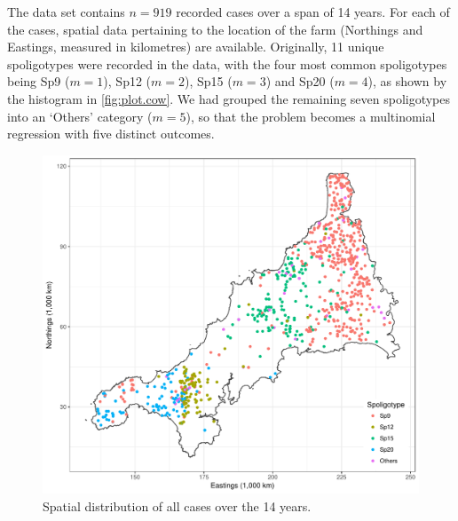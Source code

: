 \documentclass[a4paper,showframe,11pt]{report}\usepackage[]{graphicx}\usepackage[]{color}
\newenvironment{knitrout}{}{} %
\begin{document}
The data set contains $n=919$ recorded cases over a span of 14 years.
For each of the cases, spatial data pertaining to the location of the farm (Northings and Eastings, measured in kilometres) are available.
Originally, 11 unique spoligotypes were recorded in the data, with the four most common spoligotypes being Sp9 ($m=1$), Sp12 ($m=2$), Sp15 ($m=3$) and Sp20 ($m=4$), as shown by the histogram in \cref{fig:plot.cow}.
We had grouped the remaining seven spoligotypes into an `Others' category ($m=5$), so that the problem becomes a multinomial regression with five distinct outcomes.

\begin{knitrout}
\color{fgcolor}\begin{figure}[htb]

{\centering \includegraphics[width=\linewidth]{figure/05-plot_cornwall-1} 

}

\caption[Spatial distribution of all cases over the 14 years]{Spatial distribution of all cases over the 14 years.}\label{fig:plot.cornwall}
\end{figure}


\end{knitrout}
\end{document}
